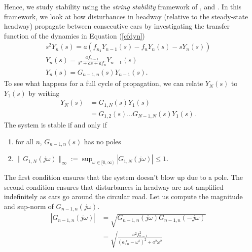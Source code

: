 \documentclass[10pt,twocolumn]{article}
\theoremstyle{ss}
\begin{document}
Hence, we study stability using the {\em string stability} framework of \cite{Liang00,Liang99}, \cite{Konishi} and \cite{Yanakiev}. In this framework, we look at how disturbances in headway (relative to the steady-state headway) propagate between consecutive cars by investigating the transfer function of the dynamics in Equation (\ref{cfdyn})
\begin{gather}
s^2 Y_n(s) = a(f_{n_1}Y_{n-1}(s) - f_nY_n(s) - sY_n(s))\\
Y_n(s) = \frac{af_{n-1}}{s^2 + as + af_n}Y_{n-1}(s)\\
Y_n(s) = G_{n-1,n}(s)Y_{n-1}(s).
\end{gather}
To see what happens for a full cycle of propagation, we can relate $Y_N(s)$ to $Y_1(s)$ by writing
\begin{align}
Y_N(s) &= G_{1,N}(s) Y_1(s)\\
&= G_{1,2}(s) \dots G_{N-1,N}(s) Y_1(s).
\end{align}
The system is stable if and only if
\begin{enumerate}
\item for all $n$, $G_{n-1,n}(s)$ has no poles
\item $\|G_{1,N}(j\omega)\|_{\infty} := \displaystyle \sup_{\omega \in [0,\infty)} |G_{1,N}(j\omega)| \leq 1$.
\end{enumerate}
The first condition ensures that the system doesn't blow up due to a pole. The second condition ensures that disturbances in headway are not amplified indefinitely as cars go around the circular road.
Let us compute the magnitude and sup-norm of $G_{n-1,n}(j\omega)$.
\begin{align}
|G_{n-1,n}(j\omega)| &= \sqrt{G_{n-1,n}(j\omega)G_{n-1,n}(-j\omega)}\\
&= \sqrt{\frac{a^2f_{n-1}^2}{(af_n - \omega^2)^2 + a^2\omega^2}}
\end{align}
\end{document}
